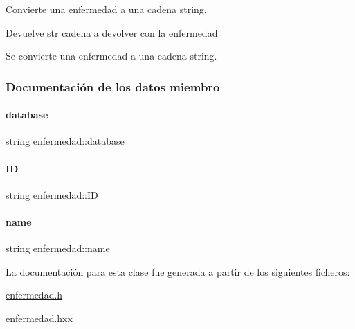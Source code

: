 Convierte una enfermedad a una cadena string. 

\begin{DoxyReturn}{Devuelve}
str cadena a devolver con la enfermedad
\end{DoxyReturn}
Se convierte una enfermedad a una cadena string. 

\subsubsection{Documentación de los datos miembro}
\hypertarget{classenfermedad_a3684b7ec850d4c9357dd21bdd5e02803}{}\label{classenfermedad_a3684b7ec850d4c9357dd21bdd5e02803} 
\paragraph{\texorpdfstring{database}{database}}
{\footnotesize\ttfamily string enfermedad\+::database\hspace{0.3cm}{\ttfamily [private]}}

\hypertarget{classenfermedad_a689cdbd469ecc28e045bda2f62a229d2}{}\label{classenfermedad_a689cdbd469ecc28e045bda2f62a229d2} 
\paragraph{\texorpdfstring{ID}{ID}}
{\footnotesize\ttfamily string enfermedad\+::\+ID\hspace{0.3cm}{\ttfamily [private]}}

\hypertarget{classenfermedad_ad7c4204057028a73bde6022678c6813e}{}\label{classenfermedad_ad7c4204057028a73bde6022678c6813e} 
\paragraph{\texorpdfstring{name}{name}}
{\footnotesize\ttfamily string enfermedad\+::name\hspace{0.3cm}{\ttfamily [private]}}



La documentación para esta clase fue generada a partir de los siguientes ficheros\+:\begin{DoxyCompactItemize}
\item 
\hyperlink{enfermedad_8h}{enfermedad.\+h}\item 
\hyperlink{enfermedad_8hxx}{enfermedad.\+hxx}\end{DoxyCompactItemize}

